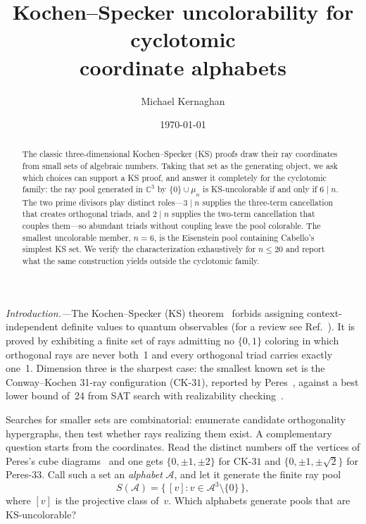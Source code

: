 \documentclass[twocolumn,prl,superscriptaddress,nofootinbib]{revtex4-2}
\newcommand{\C}{\mathbb{C}}
\newcommand{\CK}{\mathrm{CK}\text{-}31}
\begin{document}
\title{Kochen--Specker uncolorability for cyclotomic\\coordinate alphabets}

\author{Michael Kernaghan}

\date{\today}

\begin{abstract}
The classic three-dimensional Kochen--Specker (KS) proofs draw their ray
coordinates from small sets of algebraic numbers.  Taking that set as the
generating object, we ask which choices can support a KS proof, and answer it
completely for the cyclotomic family: the ray pool generated in $\C^3$ by
$\{0\}\cup\mu_n$ is KS-uncolorable if and only if $6\mid n$.  The two prime
divisors play distinct roles---$3\mid n$ supplies the three-term cancellation
that creates orthogonal triads, and $2\mid n$ supplies the two-term cancellation
that couples them---so abundant triads without coupling leave the pool colorable.
The smallest uncolorable member, $n=6$, is the Eisenstein pool containing
Cabello's simplest KS set.  We verify the characterization exhaustively for
$n\leq20$ and report what the same construction yields outside the cyclotomic
family.
\end{abstract}

\maketitle

\textit{Introduction.---}The Kochen--Specker (KS) theorem~\cite{KochenSpecker1967}
forbids assigning context-independent definite values to quantum observables
(for a review see Ref.~\cite{Budroni2022}).  It is proved by exhibiting a finite
set of rays admitting no $\{0,1\}$ coloring in which orthogonal rays are never
both~1 and every orthogonal triad carries exactly one~1.  Dimension three is the
sharpest case: the smallest known set is the Conway--Kochen 31-ray configuration
($\CK$), reported by Peres~\cite{Peres1993}, against a best lower bound of~24
from SAT search with realizability
checking~\cite{LiBrightGanesh2024,KirchwegerPeitlSzeider2023}.

Searches for smaller sets are combinatorial: enumerate candidate orthogonality
hypergraphs, then test whether rays realizing them exist.  A complementary
question starts from the coordinates.  Read the distinct numbers off the vertices
of Peres's cube diagrams~\cite{Peres1991,Peres1993} and one gets
$\{0,\pm1,\pm2\}$ for $\CK$ and $\{0,\pm1,\pm\sqrt2\}$ for Peres-33.  Call such a
set an \emph{alphabet} $\mathcal{A}$, and let it generate the finite ray pool
\[
S(\mathcal{A}) = \{\,[v] : v \in \mathcal{A}^3 \setminus \{0\}\,\},
\]
where $[v]$ is the projective class of~$v$.  Which alphabets generate pools that
are KS-uncolorable?
\end{document}
